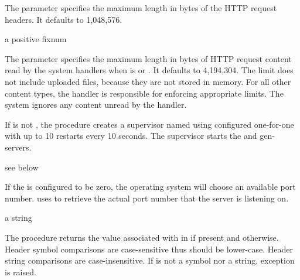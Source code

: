 The  parameter specifies the maximum length in
bytes of the HTTP request headers. It defaults to 1,048,576.

\begin{parameter}
\end{parameter}
\hasvalue{} a positive fixnum

The  parameter specifies the maximum length
in bytes of HTTP request content read by the system handlers when
 is  or
. It defaults to
4,194,304. The limit does not include uploaded files, because they are
not stored in memory. For all other content types, the handler is
responsible for enforcing appropriate limits. The system ignores any
content unread by the handler.

\begin{procedure}
\end{procedure}
\returns{}
 \alt{} 

If  is not ,
the  procedure creates a supervisor named
 using  configured
one-for-one with up to 10 restarts every 10 seconds. The supervisor
starts the  and  gen-servers.

\begin{procedure}
\end{procedure}
\returns{} see below

If the  is configured to be zero, the
operating system will choose an available port
number.  uses
 to retrieve the actual port number that
the server is listening on.

\begin{procedure}
\end{procedure}
\returns{} a string \alt{} 

The  procedure returns the value associated
with  in  if present and 
otherwise. Header symbol comparisons are case-sensitive thus
 should be lower-case. Header string comparisons are
case-insensitive. If  is not a symbol nor a string,
exception  is raised.


